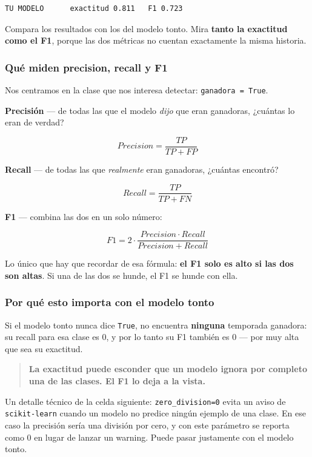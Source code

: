 \documentclass[
]{article}
\begin{document}
\begin{verbatim}
TU MODELO      exactitud 0.811   F1 0.723
\end{verbatim}

\protect{}\label{POMYtmSunYyV}
Compara los resultados con los del modelo tonto. Mira \textbf{tanto la
exactitud como el F1}, porque las dos métricas no cuentan exactamente la
misma historia.

\subsubsection{Qué miden precision, recall y
F1}\label{quuxe9-miden-precision-recall-y-f1}

Nos centramos en la clase que nos interesa detectar:
\texttt{ganadora\ =\ True}.

\textbf{Precisión} --- de todas las que el modelo \emph{dijo} que eran
ganadoras, ¿cuántas lo eran de verdad?

\[Precision = \frac{TP}{TP + FP}\]

\textbf{Recall} --- de todas las que \emph{realmente} eran ganadoras,
¿cuántas encontró?

\[Recall = \frac{TP}{TP + FN}\]

\textbf{F1} --- combina las dos en un solo número:

\[F1 = 2 \cdot \frac{Precision \cdot Recall}{Precision + Recall}\]

Lo único que hay que recordar de esa fórmula: \textbf{el F1 solo es alto
si las dos son altas}. Si una de las dos se hunde, el F1 se hunde con
ella.

\subsubsection{Por qué esto importa con el modelo
tonto}\label{por-quuxe9-esto-importa-con-el-modelo-tonto}

Si el modelo tonto nunca dice \texttt{True}, no encuentra
\textbf{ninguna} temporada ganadora: su recall para esa clase es 0, y
por lo tanto su F1 también es 0 --- por muy alta que sea su exactitud.

\begin{quote}
\textbf{La exactitud puede esconder que un modelo ignora por completo
una de las clases. El F1 lo deja a la vista.}
\end{quote}

Un detalle técnico de la celda siguiente: \texttt{zero\_division=0}
evita un aviso de \texttt{scikit-learn} cuando un modelo no predice
ningún ejemplo de una clase. En ese caso la precisión sería una división
por cero, y con este parámetro se reporta como 0 en lugar de lanzar un
warning. Puede pasar justamente con el modelo tonto.
\end{document}

